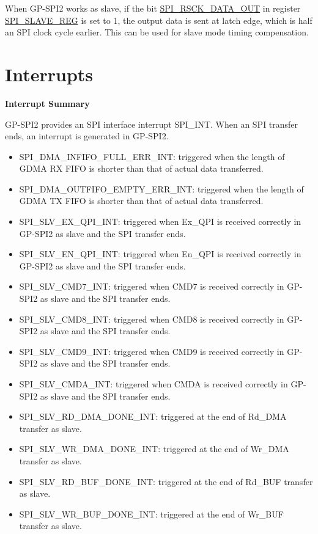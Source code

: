 \documentclass[main\_\_EN.tex]{subfiles}
\begin{document}
When GP-SPI2 works as slave, if the bit \hyperref[fielddesc:SPIRSCKDATAOUT]{SPI\_RSCK\_DATA\_OUT} in register \hyperref[regdesc:SPISLAVEREG]{SPI\_SLAVE\_REG} is set to 1, the output data is sent at latch edge, which is half an SPI clock cycle earlier. This can be used for slave mode timing compensation.


\section{Interrupts} \label{sec:spi-interrupt}

\textbf{Interrupt Summary}

GP-SPI2 provides an SPI interface interrupt SPI\_INT. When an SPI transfer ends, an interrupt is generated in GP-SPI2.

\begin{itemize}
\item \label{int:SPIINFIFOFULLERRINT}SPI\_DMA\_INFIFO\_FULL\_ERR\_INT: triggered when the length of GDMA RX FIFO is shorter than that of actual data transferred.
\item \label{int:SPIOUTFIFOEMPTYERRINT}SPI\_DMA\_OUTFIFO\_EMPTY\_ERR\_INT: triggered when the length of GDMA TX FIFO is shorter than that of actual data transferred.   

\item \label{int:SPISLVEXQPIINT} SPI\_SLV\_EX\_QPI\_INT: triggered when Ex\_QPI is received correctly in GP-SPI2 as slave and the SPI transfer ends.
\item \label{int:SPISLVENQPIINT} SPI\_SLV\_EN\_QPI\_INT: triggered when En\_QPI is received correctly in GP-SPI2 as slave and the SPI transfer ends.
\item \label{int:SPISLVCMD7INT} SPI\_SLV\_CMD7\_INT: triggered when CMD7 is received correctly in GP-SPI2 as slave and the SPI transfer ends.
\item \label{int:SPISLVCMD8INT} SPI\_SLV\_CMD8\_INT: triggered when CMD8 is received correctly in GP-SPI2 as slave and the SPI transfer ends.
\item \label{int:SPISLVCMD9INT} SPI\_SLV\_CMD9\_INT: triggered when CMD9 is received correctly in GP-SPI2 as slave and the SPI transfer ends.
\item \label{int:SPISLVCMDAINT} SPI\_SLV\_CMDA\_INT: triggered when CMDA is received correctly in GP-SPI2 as slave and the SPI transfer ends.

\item \label{int:SPISLVRDDMADONEINT}SPI\_SLV\_RD\_DMA\_DONE\_INT: triggered at the end of Rd\_DMA transfer as slave.
\item \label{int:SPISLVWRDMADONEINT}SPI\_SLV\_WR\_DMA\_DONE\_INT: triggered at the end of Wr\_DMA transfer as slave.
\item \label{int:SPISLVRDBUFDONEINT}SPI\_SLV\_RD\_BUF\_DONE\_INT: triggered at the end of Rd\_BUF transfer as slave.
\item \label{int:SPISLVWRBUFDONEINT}SPI\_SLV\_WR\_BUF\_DONE\_INT: triggered at the end of Wr\_BUF transfer as slave.


\end{itemize}
\end{document}
